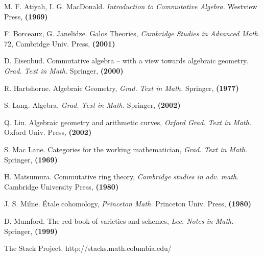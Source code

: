 \newpage

\begin{thebibliography}{10}

M. F. Atiyah, I. G. MacDonald.
{\em Introduction to Commutative Algebra.}
Westview Press, \textbf{(1969)}

F. Borceaux, G. Janelidze.
Galos Theories,
{\em Cambridge Studies in Advanced Math.} 72,
Cambridge Univ. Press, \textbf{(2001)}

D. Eisenbud.
Commutative algebra -- with a view towards algebraic geometry.
{\em Grad. Text in Math.}
Springer, \textbf{(2000)}

R. Hartshorne.
Algebraic Geometry, {\em Grad. Text in Math.}
Springer, \textbf{(1977)}

S. Lang.
Algebra, {\em Grad. Text in Math.}
Springer, \textbf{(2002)}

Q. Liu.
Algebraic geometry and arithmetic curves, {\em Oxford Grad. Text in Math.}
Oxford Univ. Press, \textbf{(2002)}

S. Mac Lane.
Categories for the working mathematician, {\em Grad. Text in Math.}
Springer, \textbf{(1969)}

H. Matsumura.
Commutative ring theory, {\em Cambridge studies in adv. math.}
Cambridge University Press, \textbf{(1980)}

J. S. Milne.
\'Etale cohomology, {\em Princeton Math.}
Princeton Univ. Press, \textbf{(1980)}

D. Mumford.
The red book of varieties and schemes, {\em Lec. Notes in Math.}
Springer, \textbf{(1999)}

The Stack Project.
http://stacks.math.columbia.edu/

\end{thebibliography}
